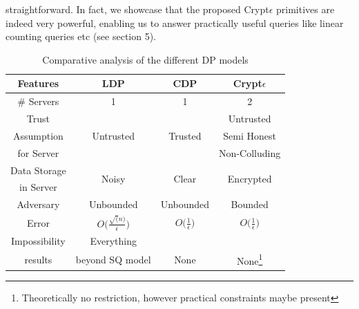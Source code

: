straightforward. In fact, we showcase that the proposed Crypt$\epsilon$ primitives are indeed very powerful, enabling us to answer practically useful queries like linear counting queries etc (see section 5). 
\begin{table}[h!]
\centering
\caption {Comparative analysis of the different DP models}
 \begin{tabular}{c| c c c}  \toprule
\textbf{Features} & \textbf{LDP}  & \textbf{CDP}  & \textbf{Crypt$\epsilon$}  \\ [0.5ex] 
 \midrule \midrule \# Servers & 1& 1 & 2\\\hline
Trust  & & & Untrusted \\  Assumption & Untrusted & Trusted & Semi Honest \\for Server &  &   &  Non-Colluding  \\ \hline
Data Storage & \multirow{2}{*}{Noisy} & \multirow{2}{*}{Clear} & \multirow{2}{*}{Encrypted} \\in Server & &  &  \\\hline
Adversary & Unbounded & Unbounded & Bounded \\\hline
 Error & $O\Big(\frac{\sqrt(n)}{\epsilon}\Big)$& $O\Big(\frac{1}{\epsilon}\Big)$ & $O\Big(\frac{1}{\epsilon}\Big)$\\\hline
 Impossibility & Everything && \\results & beyond SQ\cite{} model & None & None\footnote{Theoretically no restriction, however practical constraints maybe present}\\
  [1ex] 
 \bottomrule
 \end{tabular}
\end{table}


